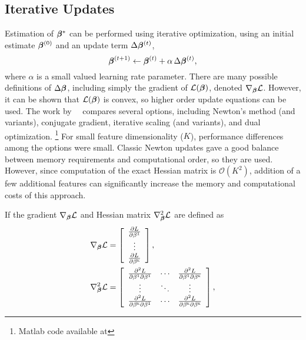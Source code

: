 \subsection{Iterative Updates}
Estimation of $\bm{\beta}^*$ can be performed using iterative optimization,
using an initial estimate $\bm{\beta}^{(0)}$ and an update term $\Delta\bm{\beta}^{(t)}$,
\begin{equation}
  \bb^{(t+1)} \leftarrow \bb^{(t)} + \alpha\thinspace\Delta\bb^{(t)},%
  \label{eq:update}
\end{equation}
where $\alpha$ is a small valued learning rate parameter.
There are many possible definitions of $\Delta\bm{\beta}$,
including simply the gradient of $\mathcal{L}(\bm{\beta})$, denoted $\nabla_{\bm{\beta}}\mathcal{L}$.
However, it can be shown that $\mathcal{L}(\bm{\beta})$ is convex, so higher order update equations can be used.
The work by~\citeauthor{Minka2003}~\cite{Minka2003} compares several options,
including Newton's method (and variants),
conjugate gradient, iterative scaling (and variants), and dual optimization.%
\footnote{Matlab code available at }
For small feature dimensionality ($K$), performance differences among the options were small.
Classic Newton updates gave a good balance between memory requirements and computational order,
so they are used.
However, since computation of the exact Hessian matrix is $\mathcal{O}(K^2)$,
addition of a few additional features can significantly increase the memory and computational
costs of this approach.
\par
If the gradient $\nabla_{\bm{\beta}}\mathcal{L}$ and Hessian matrix $\nabla^2_{\bm{\beta}}\mathcal{L}$ are defined as
\begin{align}
  \nabla_{\bb}\L   &= \left[\begin{array}{c}
                        \frac{\d L}{\d\b^1}\\\vdots\\\frac{\d L}{\d\b^\sk}
                      \end{array}\right],%
  \label{eq:llgradient0}\\
  \nabla^2_{\bb}\L &= \left[\begin{array}{ccc}
                        \frac{\d^2 L}{\d\b^1\d\b^1}   & \cdots & \frac{\d^2 L}{\d\b^1\d\b^\sk}\\
                                               \vdots & \ddots & \vdots \\
                        \frac{\d^2 L}{\d\b^\sk\d\b^1} & \cdots & \frac{\d^2 L}{\d\b^\sk\d\b^\sk}
                      \end{array}\right]%
  \label{eq:llhessian0},
\end{align}
